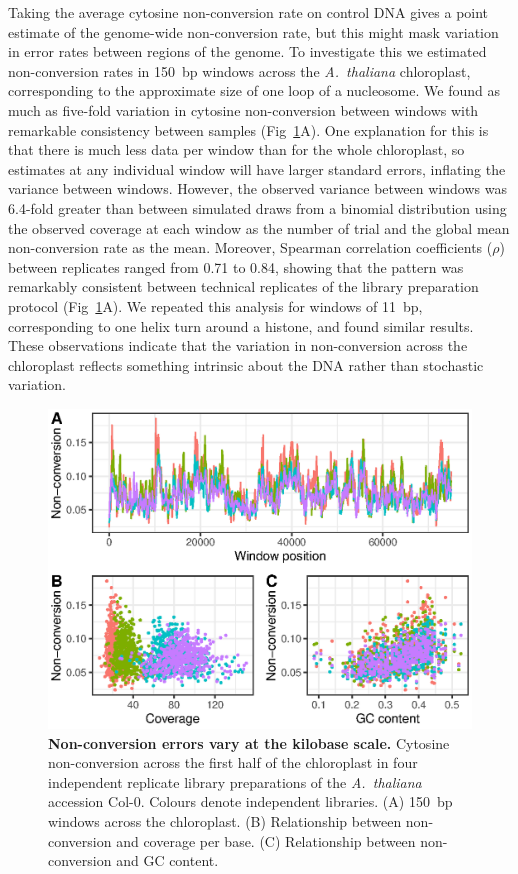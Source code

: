 \documentclass[10pt,draft,letterpaper]{article}
\begin{document}
Taking the average cytosine non-conversion rate on control DNA gives a point estimate of the genome-wide non-conversion rate, but this might mask variation in error rates between regions of the genome.
To investigate this we estimated non-conversion rates in 150~bp windows across the \emph{A.~thaliana} chloroplast, corresponding to the approximate size of one loop of a nucleosome.
We found as much as five-fold variation in cytosine non-conversion between windows with remarkable consistency between samples (Fig~\ref{fig:uncertainty}A).
One explanation for this is that there is much less data per window than for the whole chloroplast, so estimates at any individual window will have larger standard errors, inflating the variance between windows.
However, the observed variance between windows was 6.4-fold greater than between simulated draws from a binomial distribution using the observed coverage at each window as the number of trial and the global mean non-conversion rate as the mean.
Moreover, Spearman correlation coefficients ($\rho$) between replicates ranged from 0.71 to 0.84, showing that the pattern was remarkably consistent between technical replicates of the library preparation protocol (Fig~\ref{fig:uncertainty}A).
We repeated this analysis for windows of 11~bp, corresponding to one helix turn around a histone, and found similar results.
These observations indicate that the variation in non-conversion across the chloroplast reflects something intrinsic about the DNA rather than stochastic variation.

\begin{figure}
  \begin{center}
    \includegraphics{figure2.eps}
    \caption{
        {\bf Non-conversion errors vary at the kilobase scale.}
        Cytosine non-conversion across the first half of the chloroplast in four independent replicate library preparations of the \emph{A.~thaliana} accession Col-0.
        Colours denote independent libraries.
        (A) 150~bp windows across the chloroplast.
        (B) Relationship between non-conversion and coverage per base.
        (C) Relationship between non-conversion and GC content.
    }
    \label{fig:uncertainty}
  \end{center}
\end{figure}
\end{document}
